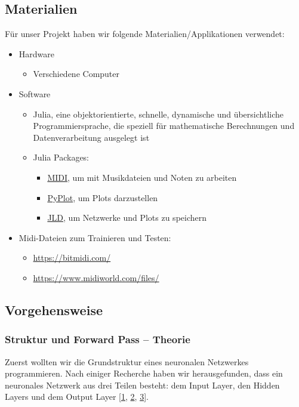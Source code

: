 \documentclass[11pt, a4paper, ngerman]{article}
\begin{document}
	\subsection{Materialien}
	Für unser Projekt haben wir folgende Materialien/Applikationen verwendet:
	\begin{itemize}
		\item Hardware
		\begin{itemize}
			\item Verschiedene Computer
		\end{itemize}
		\item Software
		\begin{itemize}
			\item Julia, eine objektorientierte, schnelle, dynamische und übersichtliche Programmiersprache, die speziell für mathematische Berechnungen und Datenverarbeitung ausgelegt ist
			\item Julia Packages:
			\begin{itemize}
				\item \hyperref[src:midi]{MIDI}, um mit Musikdateien und Noten zu arbeiten
				\item \hyperref[src:pyplot]{PyPlot}, um Plots darzustellen
				\item \hyperref[src:jld]{JLD}, um Netzwerke und Plots zu speichern
			\end{itemize}
		\end{itemize}
		\item Midi-Dateien zum Trainieren und Testen:
		\begin{itemize}
			\item \href{https://bitmidi.com/}{https://bitmidi.com/}
			\item \href{https://www.midiworld.com/files/}{https://www.midiworld.com/files/}
		\end{itemize}
	\end{itemize}
	\subsection{Vorgehensweise} \label{Vorgehensweise}
		\subsubsection{Struktur und Forward Pass -- Theorie} \label{Struktur und Forwardpass - Theorie}
		Zuerst wollten wir die Grundstruktur eines neuronalen Netzwerkes programmieren. Nach einiger Recherche haben wir herausgefunden, dass ein neuronales Netzwerk aus drei Teilen besteht: dem Input Layer, den Hidden Layers und dem Output Layer [\hyperref[src:1]{1}, \hyperref[src:2]{2}, \hyperref[src:2]{3}].
		
\end{document}
